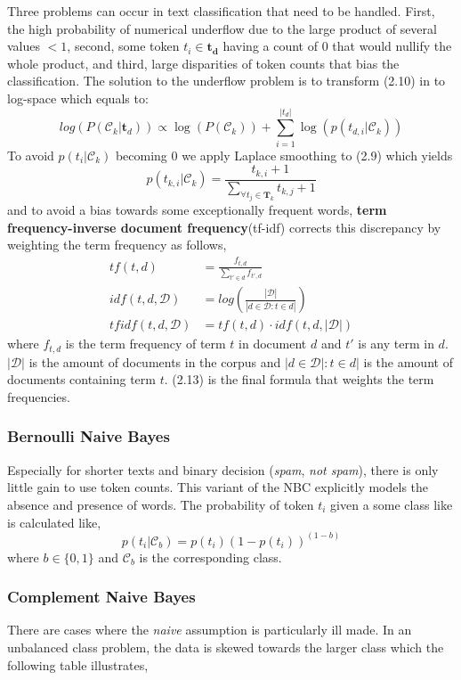 Three problems can occur in text classification that need to be handled. First, the high probability of numerical underflow due to the large product of several values $<1$, second, some token $t_i \in \boldsymbol{t_d}$ having a count of $0$ that would nullify the whole product, and third, large disparities of token counts that bias the classification. The solution to the underflow problem is to transform (2.10) in to log-space which equals to:
%
\[log(P(\mathcal{C}_k|\boldsymbol{t}_d)) \propto \log(P(\mathcal{C}_k)) + \sum_{i=1}^{|t_{d}|} \log({p(t_{d,i}|\mathcal{C}_k)}) \]
%
To avoid $p({t_{i}}|\mathcal{C}_k)$ becoming $0$ we apply Laplace smoothing to (2.9) which yields
\[ p({t_{k,i}}|\mathcal{C}_k) = \frac{t_{k, i} + 1}{\sum_{\forall t_j \in \boldsymbol{T}_k} t_{k, j} + 1} \]
and to avoid a bias towards some exceptionally frequent words, \textbf{term frequency-inverse document frequency}(\gls{tf-idf}) corrects this discrepancy by weighting the term frequency as follows,
\begin{align}
  tf(t,d) &= \frac{f_{t,d}}{\sum_{t' \in d} f_{t',d}}\\
  idf(t,d, \mathcal{D}) &= log\left( \frac{|\mathcal{D}|}{|d \in \mathcal{D}: t \in d|}\right)\\
  tfidf(t,d, \mathcal{D}) &= tf(t,d) \cdot idf(t,d, |\mathcal{D}|)
\end{align}
where $f_{t,d}$ is the term frequency of term $t$ in document $d$ and $t'$ is any term in $d$. $|\mathcal{D}|$ is the amount of documents in the corpus and $|d \in \mathcal{D}|: t \in d|$ is the amount of documents containing term $t$. (2.13) is the final formula that weights the term frequencies.

\subsubsection{Bernoulli Naive Bayes}
Especially for shorter texts and binary decision (\emph{spam}, \emph{not spam}), there is only little gain to use token counts. This variant of the NBC explicitly models the absence and presence of words. The probability of token $t_i$ given a some class like is calculated like,
\[p(t_{i}|\mathcal{C}_b) = p(t_{i})(1-p(t_{i}))^{(1-b)}\]
where $b \in \{0,1\}$ and $\mathcal{C}_b$ is the corresponding class.

\subsubsection{Complement Naive Bayes}
There are cases where the \textsl{naive} assumption is particularly ill made. In an unbalanced class problem, the data is skewed towards the larger class which the following table illustrates,

